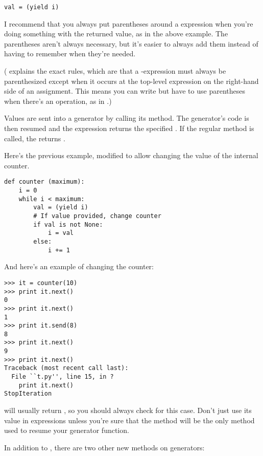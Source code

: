 \documentclass{howto}
\begin{document}
\begin{verbatim}
val = (yield i)
\end{verbatim}

I recommend that you always put parentheses around a 
expression when you're doing something with the returned value, as in
the above example.  The parentheses aren't always necessary, but it's
easier to always add them instead of having to remember when they're
needed.

( explains the exact rules, which are that a
-expression must always be parenthesized except when it
occurs at the top-level expression on the right-hand side of an
assignment.  This means you can write  but have to
use parentheses when there's an operation, as in .)

Values are sent into a generator by calling its
 method.  The generator's code is then
resumed and the  expression returns the specified
.  If the regular  method is called, the
 returns .

Here's the previous example, modified to allow changing the value of
the internal counter.

\begin{verbatim}
def counter (maximum):
    i = 0
    while i < maximum:
        val = (yield i)
        # If value provided, change counter
        if val is not None:
            i = val
        else:
            i += 1
\end{verbatim}

And here's an example of changing the counter:

\begin{verbatim}
>>> it = counter(10)
>>> print it.next()
0
>>> print it.next()
1
>>> print it.send(8)
8
>>> print it.next()
9
>>> print it.next()
Traceback (most recent call last):
  File ``t.py'', line 15, in ?
    print it.next()
StopIteration
\end{verbatim}

 will usually return , so you
should always check for this case.  Don't just use its value in
expressions unless you're sure that the  method
will be the only method used to resume your generator function.

In addition to , there are two other new methods on
generators:
\end{document}
